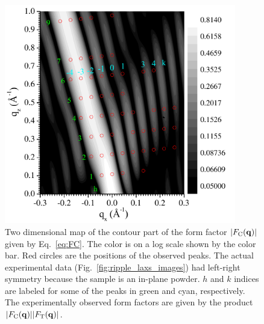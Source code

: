 \begin{figure}[htbp]
  \centering
  \includegraphics[width=0.9\textwidth]{figures/ripple/model/FT}
  \caption[Two dimensional map of the contour part of the form factor $|\FC(\mathbf{q})|$ given by
  Eq.~\ref{eq:FC}]
  {Two dimensional map of the contour part of the form factor $|\FC(\mathbf{q})|$ given by
  Eq.~\ref{eq:FC}. The color is on a log scale shown by the color bar.
  Red circles are the positions of the observed peaks. The actual
  experimental data (Fig.~\ref{fig:ripple_laxs_images}) had left-right symmetry 
  because the sample is an in-plane powder.
  $h$ and $k$ indices are labeled for some of the peaks in green and cyan,
  respectively. The experimentally observed form factors are given by 
  the product $|F_\mathrm{C}(\mathbf{q})||F_\mathrm{T}(\mathbf{q})|$.}
  \label{fig:FC}
\end{figure}

